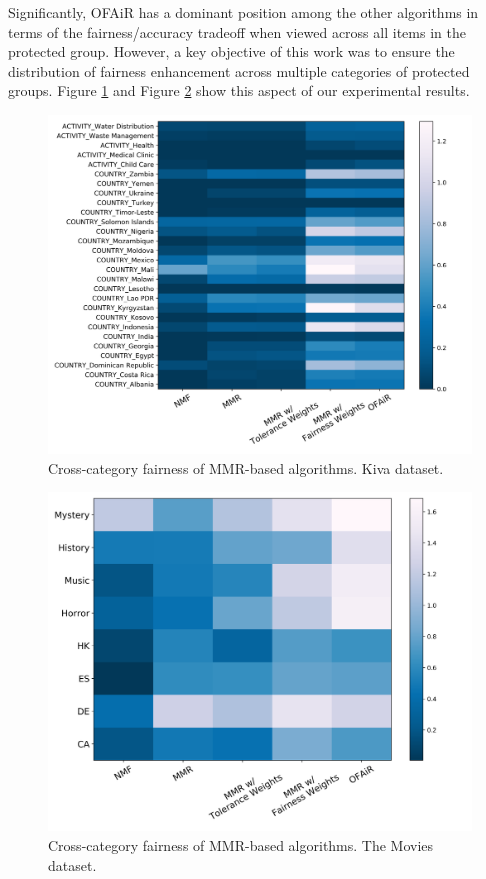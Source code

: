Significantly, OFAiR has a dominant position among the other algorithms in terms of the fairness/accuracy tradeoff when viewed across all items in the protected group.
However, a key objective of this work was to ensure the distribution of fairness enhancement across multiple categories of protected groups. Figure \ref{fig:kiva_category_heatmap} and Figure \ref{fig:ML_category_heatmap} show this aspect of our experimental results.

\begin{figure}[htb!]
    \centering
    \includegraphics[width=0.8\linewidth]{imgs/ofair/kiva_heatmap_ActivityCountry.png}
    \caption{Cross-category fairness of MMR-based algorithms. Kiva dataset.}
    \label{fig:kiva_category_heatmap}
\end{figure}

\begin{figure}[htb!]
    \centering
    \includegraphics[width=0.8\linewidth]{imgs/ofair/ml_heatmap_CountryGenre.png}
    \caption{Cross-category fairness of MMR-based algorithms. The Movies dataset.}
    \label{fig:ML_category_heatmap}
\end{figure}

